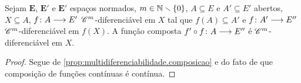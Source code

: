 \begin{proposition}
\label{prop:multidiferenciabilidade.continua.composicao}
Sejam $\bm E$, $\bm E'$ e $\bm E'$ espaços normados, $m \in \mathbb{N} \smallsetminus \{0\}$, $A \subseteq E$ e $A' \subseteq E'$ abertos, $X \subseteq A$, ${f}\colon {A} \longrightarrow {E'}$ $\mathscr{C}^m$-diferenciável em $X$ tal que $f(A) \subseteq A'$ e ${f}\colon {A'} \longrightarrow {E''}$ $\mathscr{C}^m$-diferenciável em $f(X)$. A função composta ${f' \circ f}\colon {A} \longrightarrow {E''}$ é $\mathscr{C}^m$-diferenciável em $X$.
\end{proposition}
\begin{proof}
Segue de \ref{prop:multidiferenciabilidade.composicao} e do fato de que composição de funções contínuas é contínua.
%
%
\end{proof}

